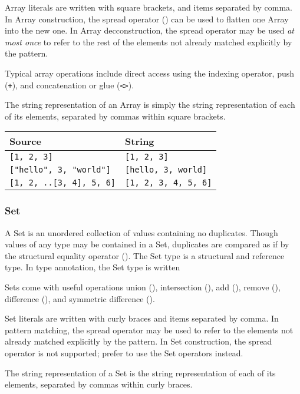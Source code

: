 Array literals are written with square brackets, and items separated by
comma. In Array construction, the spread operator () can be used
to flatten one Array into the new one. In Array decconstruction, the spread
operator may be used \emph{at most once} to refer to the rest of the elements
not already matched explicitly by the pattern.

Typical array operations include direct access using the indexing operator,
push (\texttt{+}), and concatenation or glue (\texttt{<>}).

The string representation of an Array is simply the string representation of
each of its elements, separated by commas within square brackets.

\begin{table}[H]
    \centering
    \begin{tabular}{ll}
        \hline
        \textbf{Source} & \textbf{String} \\
        \hline
        \texttt{[1, 2, 3]} & \texttt{[1, 2, 3]} \\
        \texttt{["hello", 3, "world"]} & \texttt{[hello, 3, world]} \\
        \texttt{[1, 2, ..[3, 4], 5, 6]} & \texttt{[1, 2, 3, 4, 5, 6]} \\
        \hline
    \end{tabular}
\end{table}

\subsubsection{Set}

A Set is an unordered collection of values containing no duplicates. Though
values of any type may be contained in a Set, duplicates are compared as if
by the structural equality operator (). The Set type is a structural
and reference type. In type annotation, the Set type is written 

Sets come with useful operations union (\op{|}), intersection (\op{\&}),
add (\op{+}), remove (\op{-}), difference (\op{/}), and symmetric
difference (\op{\textasciicircum}).

Set literals are written with curly braces and items separated by comma.
In pattern matching, the spread operator may be used to refer to the elements
not already matched explicitly by the pattern. In Set construction, the
spread operator is not supported; prefer to use the Set operators instead.

The string representation of a Set is the string representation of
each of its elements, separated by commas within curly braces.

